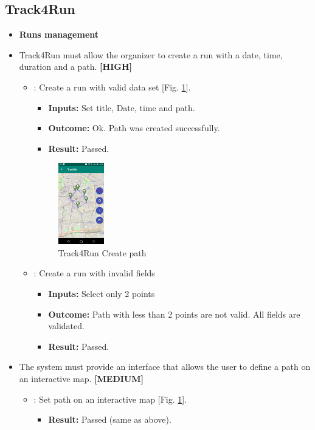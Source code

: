 \documentclass[a4paper, hidelinks, 12pt]{report}
\newcommand\requirement[1]{\item[{[REQ-#1]}] }
\newcommand\test[1]{\item[{[TEST-#1]}] }
\begin{document}
	\subsection{Track4Run}
	
	\begin{itemize}
	\item \textbf{Runs management}
	\requirement{24} Track4Run must allow the organizer to create a run with a date, time, duration and a path. \textbf{[HIGH]}
					\begin{itemize}
		\test{14}: Create a run with valid data set [Fig. \ref{fig:run_path}].
			\begin{itemize}
			\item \textbf{Inputs: } Set title, Date, time and path.			
			\item \textbf{Outcome: } Ok. Path was created successfully.
			\item \textbf{Result: } Passed. 
			\end{itemize}
			
			
		\begin{figure}[H]
					\centering
				\includegraphics[width=0.2\textwidth]{images/define_path.jpeg}
					\caption[Track4Run Create path]{Track4Run Create path}
				\label{fig:run_path}
			\end{figure}
			
		\test{15} : Create a run with invalid fields
			\begin{itemize}
			\item \textbf{Inputs: }Select only 2 points
			\item \textbf{Outcome: }Path with less than 2 points are not valid. All fields are validated.
			\item \textbf{Result: } Passed. 
			 \end{itemize}	
	\end{itemize}
	\requirement{25} The system must provide an interface that allows the user to define a path on an interactive map. \textbf{[MEDIUM]}
						\begin{itemize}
		\test{16}: Set path on an interactive map [Fig. \ref{fig:run_path}].
			\begin{itemize}
			\item \textbf{Result: } Passed (same as above). 
			\end{itemize}
	

\end{itemize}
\end{itemize}
\end{document}
